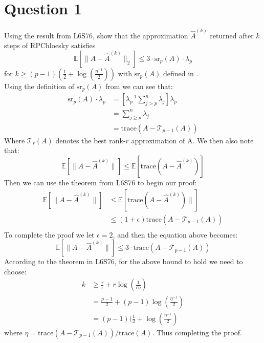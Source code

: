 \section{Question 1}
Using the result from L6S76, show that the approximation $\hat{A}^{(k)}$ returned after $k$ steps of RPChloesky
satisfies 
\begin{equation*}
    \mathds{E}\left[\lVert A - \hat{A}^{(k)} \rVert_2\right] \leq 3 \cdot \text{sr}_p(A) \cdot \lambda_p
\end{equation*}
for $k \geq (p-1)(\frac{1}{2} + \log{(\frac{\eta^{-1}}{2})})$ with $\text{sr}_p(A)$ defined in
\cite{frangella2021randomizednystrompreconditioning}.\\

Using the definition of $\text{sr}_p(A)$ from \cite{frangella2021randomizednystrompreconditioning} we can see that:
\begin{align*}
    \text{sr}_p(A)\cdot\lambda_p &= \left[\lambda_p^{-1}\sum_{j>p}^{n}{\lambda_j}\right]\lambda_p \\
                                 &= \sum_{j\geq p}^{n}{\lambda_j} \\
                                 &= \text{trace}(A - \mathcal{T}_{p-1}(A))
\end{align*}
Where $\mathcal{T}_{r}(A)$ denotes the best rank-$r$ approximation of A. We then also note that:
\begin{equation*}
    \mathds{E}\left[\lVert A - \hat{A}^{(k)} \rVert\right] \leq \mathds{E}\left[\text{trace}(A - \hat{A}^{(k)})\right]  
\end{equation*}
Then we can use the theorem from L6S76 to begin our proof:
\begin{align*}
    \mathds{E}\left[\lVert A - \hat{A}^{(k)} \rVert\right] &\leq \mathds{E}\left[\text{trace}(A - \hat{A}^{(k)}) \rVert\right] \\
                                                           &\leq (1+\epsilon)\text{trace}(A - \mathcal{T}_{p-1}(A)) \\
\end{align*}
To complete the proof we let $\epsilon=2$, and then the equation above becomes:
\begin{equation*}
    \mathds{E}\left[\lVert A - \hat{A}^{(k)} \rVert\right] \leq 3\cdot\text{trace}(A - \mathcal{T}_{p-1}(A))  
\end{equation*}
According to the theorem in L6S76, for the above bound to hold we need to choose:
\begin{align*}
    k &\geq \frac{r}{\epsilon} + r \log{(\frac{1}{\epsilon\eta})}\\
      &= \frac{p-1}{2} + (p-1)\log{(\frac{\eta^{-1}}{2})} \\
      &= (p-1)(\frac{1}{2} + \log{(\frac{\eta^{-1}}{2})}
\end{align*}
$\text{where } \eta = \text{trace}(A - \mathcal{T}_{p-1}(A))/\text{trace}(A)$. Thus completing the proof.

